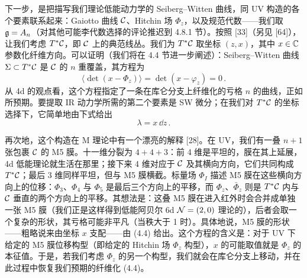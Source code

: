 下一步，是把描写我们理论低能动力学的 Seiberg--Witten 曲线，同 UV 构造的各个要素联系起来：Gaiotto 曲线 $\mathcal{C}$、Hitchin 场 $\Phi_z$，以及规范代数——我们取 $\mathfrak{g}=A_n$（对其他可能李代数选择的评论推迟到 4.8.1 节）。按照 [33]（另见 [64]），让我们考虑 $T^*\mathcal{C}$，即 $\mathcal{C}$ 上的典范线丛。我们为 $T^*\mathcal{C}$ 取坐标 $(z,x)$，其中 $x\in\mathbb{C}$ 参数化纤维方向。可以证明（我们将在 4.4 节进一步阐述）：Seiberg--Witten 曲线 $\Sigma\subset T^*\mathcal{C}$ 是 $\mathcal{C}$ 的 $n$ 重覆盖，其方程为
\begin{equation}
  \big\langle \det\left(x-\Phi_z\right)\big\rangle = \det\left(x-\varphi_z\right) = 0\,.
  \tag{4.4}
\end{equation}
从 4d 的观点看，这个方程指定了一条在库仑分支上纤维化的亏格 $n$ 的曲线，正如所预期。要提取 IR 动力学所需的第二个要素是 SW 微分；在我们对 $T^*\mathcal{C}$ 的坐标选择下，它简单地由下式给出
\begin{equation}
  \lambda = x\,\dd z\,.
  \tag{4.5}
\end{equation}

再次地，这个构造在 M 理论中有一个漂亮的解释 [28]。在 UV，我们有一叠 $n+1$ 张包裹 $\mathcal{C}$ 的 M5 膜。十一维分裂为 $4+4+3$：前 4 维是平坦的，膜在其上延展，4d 低能理论就生活在那里；接下来 4 维对应于 $\mathcal{C}$ 及其横向方向，它们共同构成 $T^*\mathcal{C}$；最后 3 维同样平坦，但与 M5 膜横截。标量场 $\Phi_I$ 描述 M5 膜在这些横向方向上的位移：$\Phi_3$、$\Phi_4$ 与 $\Phi_5$ 是最后三个方向上的平移，而 $\Phi_z$、$\bar\Phi_z$ 则是 $T^*\mathcal{C}$ 内与 $\mathcal{C}$ 垂直的两个方向上的平移。其想法是：这叠 M5 膜在进入红外时会合并成单独一张 M5 膜（我们正是这样得到低能阿贝尔 6d $\mathcal{N}=(2,0)$ 理论的），后者会取一个复杂的形状，其亏格可能非平凡（当秩大于 1 时）。具体地说，M5 膜的形状——粗略说来由坐标 $x$ 支配——由 (4.4) 给出。这个方程的含义是：对于 UV 下给定的 M5 膜位移构型（即给定的 Hitchin 场 $\Phi_z$ 构型），$x$ 的可能取值就是 $\Phi_z$ 的本征值。于是，若我们考虑 $\Phi_z$ 的另一个构型，我们就会在库仑分支上移动，并在此过程中恢复我们预期的纤维化 (4.4)。

